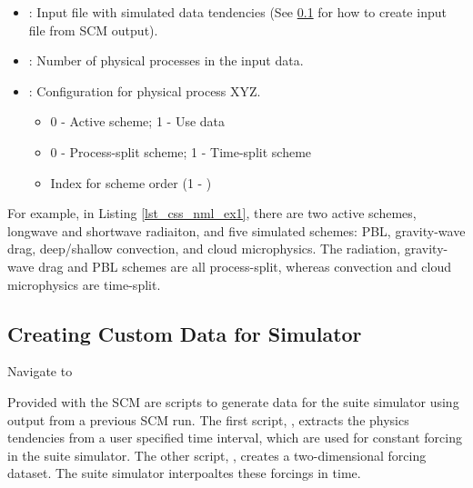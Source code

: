 

\begin{itemize}
\item {}: Input file with simulated data tendencies (See \ref{section:Creating_Custom_Data_for_Simulator} for how to create input file from SCM output).
\item {}: Number of physical processes in the input data.
\item {}: Configuration for physical process XYZ.
\begin{itemize}
\item 0 - Active scheme; 1 - Use data
\item 0 - Process-split scheme; 1 - Time-split scheme
\item Index for scheme order (1 - )
\end{itemize}
\end{itemize}

For example, in Listing \ref{lst_css_nml_ex1}, there are two active schemes, longwave and shortwave radiaiton, and five simulated schemes: PBL, gravity-wave drag, deep/shallow convection, and cloud microphysics. The radiation, gravity-wave drag and PBL schemes are all process-split, whereas convection and cloud microphysics are time-split. 

\subsection{Creating Custom Data for Simulator}
\label{section:Creating_Custom_Data_for_Simulator}

Navigate to 

Provided with the SCM are scripts to generate data for the suite simulator using output from a previous SCM run. The first script, , extracts the physics tendencies from a user specified time interval, which are used for constant forcing in the suite simulator. The other script, , creates a two-dimensional forcing dataset. The suite simulator interpoaltes these forcings in time.

